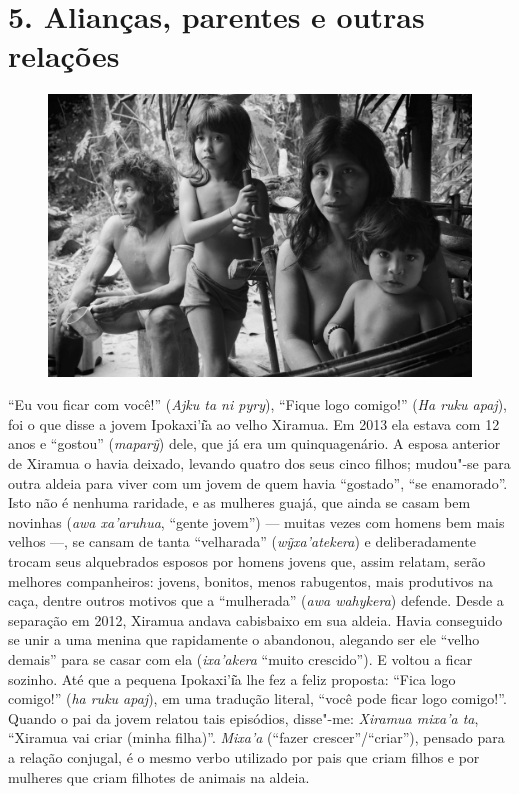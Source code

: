 
\chapter{5. Alianças, parentes e outras relações}\label{alianuxe7as-parentes-e-outras-relauxe7uxf5es}

\begin{figure}[H]
\centering
  \includegraphics[width=\textwidth]{./imgs/IMG_4928}
\end{figure}

\noindent ``Eu vou ficar com você!'' (\emph{Ajku ta ni pyry}), ``Fique logo comigo!''
(\emph{Ha ruku apaj}), foi o que disse a jovem Ipokaxi'ı͂a ao velho
Xiramua. Em 2013 ela estava com 12 anos e ``gostou'' (\emph{maparỹ}) dele,
que já era um quinquagenário. A esposa anterior de Xiramua o havia
deixado, levando quatro dos seus cinco filhos; mudou"-se para outra
aldeia para viver com um jovem de quem havia ``gostado'', ``se enamorado''.
Isto não é nenhuma raridade, e as mulheres guajá, que ainda se casam bem
novinhas (\emph{awa xa'aruhua}, ``gente jovem'') --- muitas vezes com homens
bem mais velhos ---, se cansam de tanta ``velharada'' (\emph{wỹxa'atekera})
e deliberadamente trocam seus alquebrados esposos por homens jovens que,
assim relatam, serão melhores companheiros: jovens, bonitos, menos
rabugentos, mais produtivos na caça, dentre outros motivos que a
``mulherada'' (\emph{awa wahykera}) defende. Desde a separação em 2012,
Xiramua andava cabisbaixo em sua aldeia. Havia conseguido se unir a uma
menina que rapidamente o abandonou, alegando ser ele ``velho demais'' para
se casar com ela (\emph{ixa'akera} ``muito crescido''). E voltou a ficar
sozinho. Até que a pequena Ipokaxi'ı͂a lhe fez a feliz proposta: ``Fica
logo comigo!'' (\emph{ha ruku apaj}), em uma tradução literal, ``você pode
ficar logo comigo!''. Quando o pai da jovem relatou tais episódios,
disse"-me: \emph{Xiramua mixa'a ta}, ``Xiramua vai criar (minha filha)''.
\emph{Mixa'a} (``fazer crescer''/``criar''), pensado para a relação
conjugal, é o mesmo verbo utilizado por pais que criam filhos e por
mulheres que criam filhotes de animais na aldeia.

